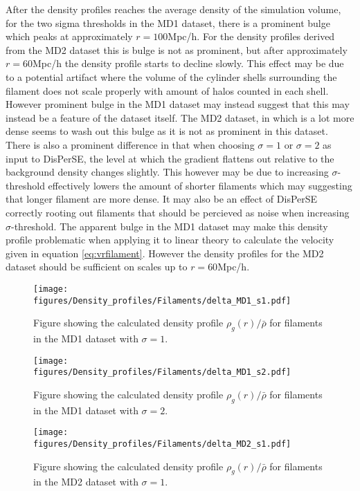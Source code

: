 After the density profiles reaches the average density of the simulation volume, for the two sigma thresholds in the MD1 dataset, there is a prominent bulge which peaks at approximately $r=100$Mpc/h. For the density profiles derived from the MD2 dataset this is bulge is not as prominent, but after approximately $r=60$Mpc/h the density profile starts to decline slowly. This effect may be due to a potential artifact where the volume of the cylinder shells surrounding the filament does not scale properly with amount of halos counted in each shell. However prominent bulge in the MD1 dataset may instead suggest that this may instead be a feature of the dataset itself. The MD2 dataset, in which is a lot more dense seems to wash out this bulge as it is not as prominent in this dataset. There is also a prominent difference in that when choosing $\sigma=1$ or $\sigma=2$ as input to DisPerSE, the level at which the gradient flattens out relative to the background density changes slightly. This however may be due to increasing $\sigma$-threshold effectively lowers the amount of shorter filaments which may suggesting that longer filament are more dense. It may also be an effect of DisPerSE correctly rooting out filaments that should be percieved as noise when increasing $\sigma$-threshold. The apparent bulge in the MD1 dataset may make this density profile problematic when applying it to linear theory to calculate the velocity given in equation \ref{eq:vrfilament}. However the density profiles for the MD2 dataset should be sufficient on scales up to $r=60$Mpc/h.
\begin{figure}[H]
    \texttt{[image: figures/Density\_profiles/Filaments/delta\_MD1\_s1.pdf]}
    \caption{Figure showing the calculated density profile $\rho_g(r)/\bar{\rho}$ for filaments in the MD1 dataset with $\sigma=1$.}
    \label{fig:fildensitytMD1s1}
\end{figure}

\begin{figure}[H]
    \texttt{[image: figures/Density\_profiles/Filaments/delta\_MD1\_s2.pdf]}
    \caption{Figure showing the calculated density profile $\rho_g(r)/\bar{\rho}$ for filaments in the MD1 dataset with $\sigma=2$.}
    \label{fig:fildensitytMD1s2}
\end{figure}

\begin{figure}[H]
    \texttt{[image: figures/Density\_profiles/Filaments/delta\_MD2\_s1.pdf]}
    \caption{Figure showing the calculated density profile $\rho_g(r)/\bar{\rho}$ for filaments in the MD2 dataset with $\sigma=1$.}
    \label{fig:fildensitytMD2s1}
\end{figure}

